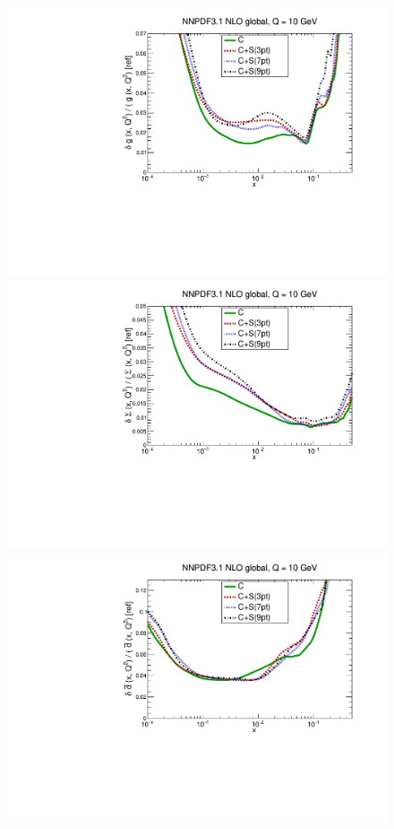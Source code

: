 \begin{figure}[t]
  \begin{center}
    \includegraphics[scale=0.39]{mhous/plots/xg-ERR-Global-NLO-CovMatTH-prescriptions-uncertainties.pdf}
    \includegraphics[scale=0.39]{mhous/plots/xsinglet-ERR-Global-NLO-CovMatTH-prescriptions-uncertainties.pdf}
    \includegraphics[scale=0.39]{mhous/plots/xdbar-ERR-Global-NLO-CovMatTH-prescriptions-uncertainties.pdf}

\end{center}
\end{figure}
